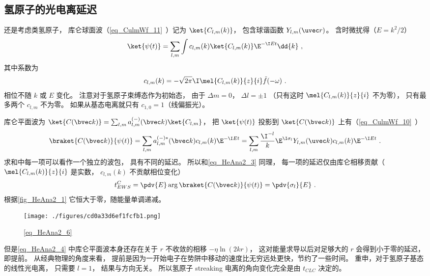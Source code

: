 \subsection{氢原子的光电离延迟}\label{sub_HeAna2_1}
还是考虑类氢原子， 库仑球面波（\autoref{eq_CulmWf_11}~）记为 $\ket{C_{l,m}(k)}$， 包含球谐函数 $Y_{l,m}(\uvec r)$。 含时微扰得（$E = k^2/2$）
\begin{equation}\label{eq_HeAna2_4}
\ket{\psi(t)} = \sum_{l,m} \int c_{l,m}(k) \ket{C_{l,m}(k)} \E^{-\I E t} \dd{k}~,
\end{equation}
其中系数为
\begin{equation}
c_{l,m}(k) = -\sqrt{2\pi}\I \mel{C_{l,m}(k)}{z}{i} \tilde f(-\omega)~.
\end{equation}
相位不随 $k$ 或 $E$ 变化。 注意对于氢原子束缚态作为初始态， 由于 $\Delta m = 0$， $\Delta l = \pm 1$ （只有这时 $\mel{C_{l,m}(k)}{z}{i}$ 不为零）， 只有最多两个 $c_{l,m}$ 不为零。 如果从基态电离就只有 $c_{1,0} = 1$（线偏振光）。

库仑平面波为 $\ket{C(\bvec k)} = \sum_{l,m} a_{l,m}^{(-)}(\bvec k) \ket{C_{l,m}}$， 把 $\ket{\psi(t)}$ 投影到 $\ket{C(\bvec k)}$ 上有（\autoref{eq_CulmWf_10}~）
\begin{equation}
\braket{C(\bvec k)}{\psi(t)} = \sum_{l,m} a_{l,m}^{(-)*}(\bvec k) c_{l,m}(k) \E^{-\I E t} 
= \sum_{l,m} \frac{\I^{-l}}{k} \E^{\I\sigma_l} Y_{l,m} (\uvec k) c_{l,m}(k) \E^{-\I E t}~.
\end{equation}
求和中每一项可以看作一个独立的波包， 具有不同的延迟。 所以和\autoref{eq_HeAna2_3} 同理， 每一项的延迟仅由库仑相移贡献（$\mel{C_{l,m}(k)}{z}{i}$ 是实数， $c_{l,m}(k)$ 不贡献相位变化）
\begin{equation}\label{eq_HeAna2_6}
t_{EWS}^C = \pdv{E} \arg\braket{C(\bvec k)}{\psi(t)} = \pdv{\sigma_l}{E}~.
\end{equation}
根据\autoref{fig_HeAna2_1} 它恒大于零，随能量单调递减。
\begin{figure}[ht]
\centering
\texttt{[image: ./figures/cd0a33d6ef1fcfb1.png]}
\caption{\autoref{eq_HeAna2_6} } \label{fig_HeAna2_2}
\end{figure}

但是\autoref{eq_HeAna2_4} 中库仑平面波本身还存在关于 $r$ 不收敛的相移 $-\eta\ln (2kr)$， 这对能量求导以后对足够大的 $r$ 会得到小于零的延迟， 即提前。 从经典物理的角度来看， 提前是因为一开始电子在势阱中移动的速度比无穷远处更快，节约了一些时间。 重申，对于氢原子基态的线性光电离， 只需要 $l = 1$， 结果与方向无关。 所以氢原子 streaking 电离的角向变化完全是由 $t_{CLC}$ 决定的。

